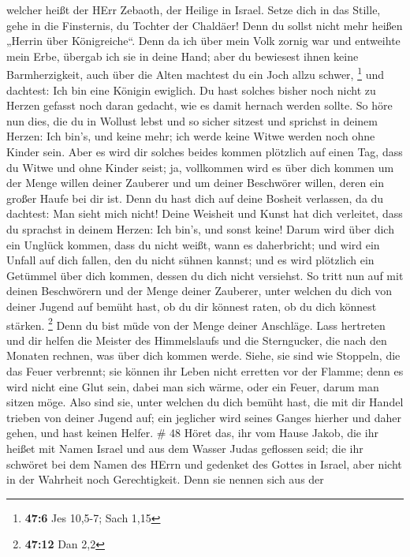 welcher heißt der HErr Zebaoth, der Heilige in Israel. 
Setze dich in das Stille, gehe in die Finsternis, du Tochter der
Chaldäer! Denn du sollst nicht mehr heißen „Herrin über Königreiche``.
 Denn da ich über mein Volk zornig war und entweihte mein
Erbe, übergab ich sie in deine Hand; aber du bewiesest ihnen keine
Barmherzigkeit, auch über die Alten machtest du ein Joch allzu schwer,
\footnote{\textbf{47:6} Jes 10,5-7; Sach 1,15}  und
dachtest: Ich bin eine Königin ewiglich. Du hast solches bisher noch
nicht zu Herzen gefasst noch daran gedacht, wie es damit hernach werden
sollte.  So höre nun dies, die du in Wollust lebst und so
sicher sitzest und sprichst in deinem Herzen: Ich bin's, und keine mehr;
ich werde keine Witwe werden noch ohne Kinder sein.  Aber es
wird dir solches beides kommen plötzlich auf einen Tag, dass du Witwe
und ohne Kinder seist; ja, vollkommen wird es über dich kommen um der
Menge willen deiner Zauberer und um deiner Beschwörer willen, deren ein
großer Haufe bei dir ist.  Denn du hast dich auf deine
Bosheit verlassen, da du dachtest: Man sieht mich nicht! Deine Weisheit
und Kunst hat dich verleitet, dass du sprachst in deinem Herzen: Ich
bin's, und sonst keine!  Darum wird über dich ein Unglück
kommen, dass du nicht weißt, wann es daherbricht; und wird ein Unfall
auf dich fallen, den du nicht sühnen kannst; und es wird plötzlich ein
Getümmel über dich kommen, dessen du dich nicht versiehst. 
So tritt nun auf mit deinen Beschwörern und der Menge deiner Zauberer,
unter welchen du dich von deiner Jugend auf bemüht hast, ob du dir
könnest raten, ob du dich könnest stärken. \footnote{\textbf{47:12} Dan
  2,2}  Denn du bist müde von der Menge deiner Anschläge.
Lass hertreten und dir helfen die Meister des Himmelslaufs und die
Sterngucker, die nach den Monaten rechnen, was über dich kommen werde.
 Siehe, sie sind wie Stoppeln, die das Feuer verbrennt; sie
können ihr Leben nicht erretten vor der Flamme; denn es wird nicht eine
Glut sein, dabei man sich wärme, oder ein Feuer, darum man sitzen möge.
 Also sind sie, unter welchen du dich bemüht hast, die mit
dir Handel trieben von deiner Jugend auf; ein jeglicher wird seines
Ganges hierher und daher gehen, und hast keinen Helfer. \# 48
 Höret das, ihr vom Hause Jakob, die ihr heißet mit Namen
Israel und aus dem Wasser Judas geflossen seid; die ihr schwöret bei dem
Namen des HErrn und gedenket des Gottes in Israel, aber nicht in der
Wahrheit noch Gerechtigkeit.  Denn sie nennen sich aus der
